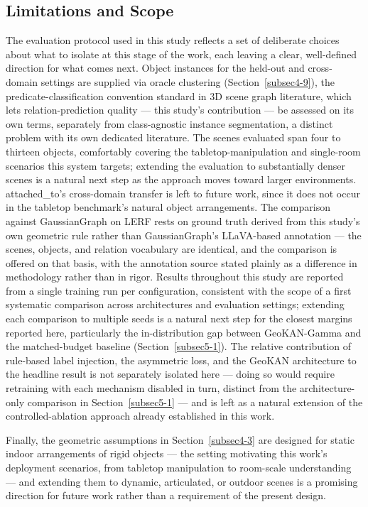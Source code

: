 \documentclass[sn-mathphys,Numbered]{sn-jnl}
\begin{document}
\FloatBarrier
\subsection{Limitations and Scope}\label{subsec5-7}

The evaluation protocol used in this study reflects a set of deliberate choices about what to isolate at this stage of the work, each leaving a clear, well-defined direction for what comes next. Object instances for the held-out and cross-domain settings are supplied via oracle clustering (Section~\ref{subsec4-9}), the predicate-classification convention standard in 3D scene graph literature, which lets relation-prediction quality --- this study's contribution --- be assessed on its own terms, separately from class-agnostic instance segmentation, a distinct problem with its own dedicated literature. The scenes evaluated span four to thirteen objects, comfortably covering the tabletop-manipulation and single-room scenarios this system targets; extending the evaluation to substantially denser scenes is a natural next step as the approach moves toward larger environments. attached\_to's cross-domain transfer is left to future work, since it does not occur in the tabletop benchmark's natural object arrangements. The comparison against GaussianGraph on LERF rests on ground truth derived from this study's own geometric rule rather than GaussianGraph's LLaVA-based annotation --- the scenes, objects, and relation vocabulary are identical, and the comparison is offered on that basis, with the annotation source stated plainly as a difference in methodology rather than in rigor. Results throughout this study are reported from a single training run per configuration, consistent with the scope of a first systematic comparison across architectures and evaluation settings; extending each comparison to multiple seeds is a natural next step for the closest margins reported here, particularly the in-distribution gap between GeoKAN-Gamma and the matched-budget baseline (Section~\ref{subsec5-1}). The relative contribution of rule-based label injection, the asymmetric loss, and the GeoKAN architecture to the headline result is not separately isolated here --- doing so would require retraining with each mechanism disabled in turn, distinct from the architecture-only comparison in Section~\ref{subsec5-1} --- and is left as a natural extension of the controlled-ablation approach already established in this work.

Finally, the geometric assumptions in Section~\ref{subsec4-3} are designed for static indoor arrangements of rigid objects --- the setting motivating this work's deployment scenarios, from tabletop manipulation to room-scale understanding --- and extending them to dynamic, articulated, or outdoor scenes is a promising direction for future work rather than a requirement of the present design.
\end{document}
